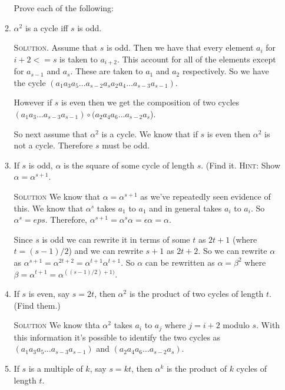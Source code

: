 \documentclass[twoside]{amsart}
\newcommand{\solution}{\textsc{Solution}\xspace}
\newcommand{\eps}{\ensuremath{\epsilon}\xspace}
\begin{document}
\begin{enumerate}[A.]
\begin{enumerate}[1]
      \noindent Prove each of the following:

      \item $\alpha^2$ is a cycle iff $s$ is odd.

      \noindent \solution. Assume that $s$ is odd. Then we have that
      every element $a_i$ for $i+2 <= s$ is taken to 
      $a_{i+2}$. 
      This account for all of
      the elements except for $a_{s-1}$ and $a_s$. These are taken
      to $a_1$ and $a_2$ respectively. So we have the cycle
      $(a_1 a_3 a_5 \dots a_{s-2} a_s a_2 a_4 \dots a_{s-3} a_{s-1})$.

      However if $s$ is even then we get the composition of
      two cycles $(a_1 a_3 \dots a_{s-3} a_{s-1})\circ (a_2 a_4 a_6 \dots
      a_{s-2} a_s$).

      So next assume that $\alpha^2$ is a cycle. We know that if $s$
      is even then $\alpha^2$ is not a cycle. Therefore $s$ must be odd.

      \item If $s$ is odd, $\alpha$ is the square of some cycle of 
      length $s$. (Find it. \textsc{Hint}: Show $\alpha = \alpha^{s+1}$.

      \noindent \solution We know that $\alpha = \alpha^{s+1}$ as we've
      repeatedly seen evidence of this. We know that $\alpha^s$ takes
      $a_1$ to $a_1$ and in general takes $a_i$ to $a_i$. So $\alpha^s=
      eps$. Therefore, $\alpha^{s+1} = \alpha^s \alpha = \eps \alpha 
      = \alpha$.

      \hspace{0.15in} Since $s$ is odd we can rewrite it in terms of some $t$ as
      $2t+1$ (where $t=(s-1)/2$) and we can rewrite $s+1$ as $2t+2$.
      So we can rewrite $\alpha$ as $\alpha^{s+1}=\alpha^{2t+2}
      =\alpha^{t+1}\alpha^{t+1}$. So $\alpha$ can be rewritten
      as $\alpha = \beta^2$ where $\beta=\alpha^{t+1}=\alpha^{((s-1)/2)+1)}$.

      \item If $s$ is even, say $s=2t$, then $\alpha^2$ is the product
      of two cycles of length $t$. (Find them.)

      \noindent \solution We know thta $\alpha^2$ takes
      $a_i$ to $a_j$ where $j=i+2$ modulo $s$. With this information it's
      possible to identify the two cycles as
      $(a_1 a_3 a_5 \dots a_{s-3} a_{s-1})$ and 
      $(a_2 a_4 a_6 \dots a_{s-2} a_{s})$.

      \item If $s$ is a multiple of $k$, say $s=kt$, then $\alpha^k$ is
      the product of $k$ cycles of length $t$.


\end{enumerate}
\end{enumerate}
\end{document}
